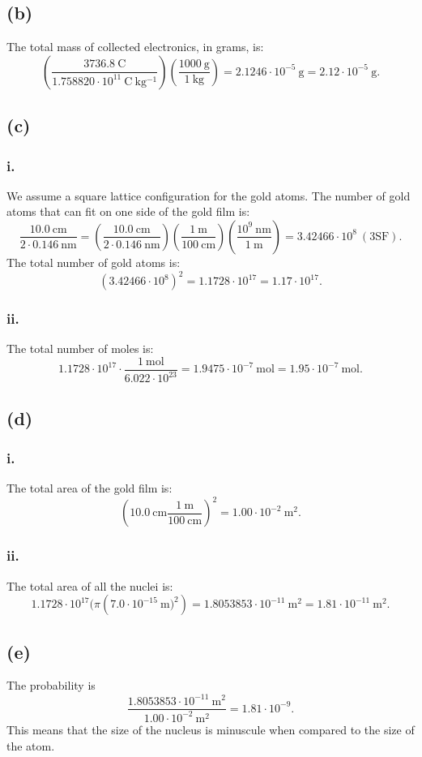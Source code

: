 \documentclass{article}
\newcommand{\unit}[1]{\mathrm{~#1}}
\begin{document}
\subsection*{(b)}
The total mass of collected electronics, in grams, is:
$$
(\frac{3736.8 \mathrm{~C}}{1.758820\cdot10^{11} \mathrm{~C~kg^{-1}}}) (\frac{1000\mathrm{~g}}{1\mathrm{~kg}}) = 2.1246\cdot10^{-5} \mathrm{~g} = 2.12\cdot10^{-5}\mathrm{~g}.
$$
\subsection*{(c)}
\subsubsection*{i.}
We assume a square lattice configuration for the gold atoms.
The number of gold atoms that can fit on one side of the gold film is:
$$
\frac{10.0\mathrm{~cm}}{2\cdot0.146\mathrm{~nm}} = (\frac{10.0\mathrm{~cm}}{2\cdot0.146\mathrm{~nm}}) (\frac{1\mathrm{~m}}{100\mathrm{~cm}})(\frac{10^9 \mathrm{~nm}}{1\mathrm{~m}}) = 3.42466\cdot10^8\mathrm{~(3SF)}.
$$
The total number of gold atoms is:
$$
(3.42466\cdot10^8)^2 = 1.1728\cdot10^{17} = 1.17\cdot10^{17}.
$$
\subsubsection*{ii.}
The total number of moles is:
$$
1.1728\cdot10^{17} \cdot \frac{1\mathrm{~mol}}{6.022\cdot10^{23}} = 1.9475\cdot10^{-7}\mathrm{~mol} = 1.95\cdot10^{-7}\mathrm{~mol}.
$$
\subsection*{(d)}
\subsubsection*{i.}
The total area of the gold film is:
$$
(10.0\unit{cm}\frac{1\unit{m}}{100\unit{cm}})^2 = 1.00\cdot10^{-2}\unit{m^2}.
$$
\subsubsection*{ii.}
The total area of all the nuclei is:
$$
1.1728\cdot10^{17}(\pi(7.0\cdot10^{-15}\unit{m)^2}) = 1.8053853\cdot10^{-11}\unit{m^2} = 1.81\cdot10^{-11}\unit{m^2}.
$$
\subsection*{(e)}
The probability is
$$
\frac{1.8053853\cdot10^{-11}\unit{m^2}}{1.00\cdot10^{-2}\unit{m^2}} = 1.81\cdot10^{-9}.
$$
This means that the size of the nucleus is minuscule when compared to the size of the atom.
\newpage
\end{document}

